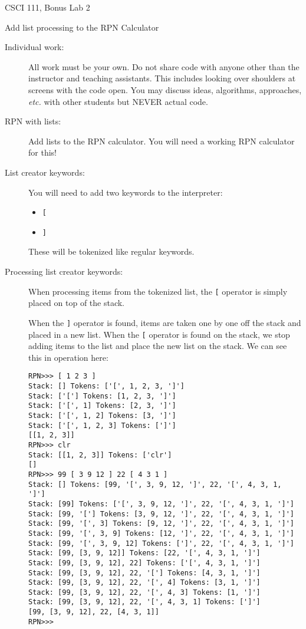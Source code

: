 \documentclass[12pt]{article}
\begin{document}
\sloppy
\centerline{\Large CSCI 111, Bonus Lab 2}
\centerline{\large Add list processing to the RPN Calculator}


\begin{description}

\item[Individual work:]  All work must be your own.  Do not share
code with anyone other than the instructor and teaching assistants.
This includes looking over shoulders at screens with the code open.
You may discuss ideas, algorithms, approaches, {\em etc.} with
other students but NEVER actual code.

\item[RPN with lists:]

Add lists to the RPN calculator.  You will need a working
RPN calculator for this!

\item[List creator keywords:]
You will need to add two keywords to the interpreter:
\begin{itemize}
\item \lstinline{[}
\item \lstinline{]}
\end{itemize}

These will be tokenized like regular keywords.

\item[Processing list creator keywords:]
When processing items from the tokenized list,
the \lstinline{[} operator is simply placed
on top of the stack.

When the \lstinline{]} operator is found,
items are taken one by one off the stack
and placed in a new list.  When the
\lstinline{[} operator is found on the
stack, we stop adding items to the list
and place the new list on the stack.
We can see this in operation here:
\begin{lstlisting}
RPN>>> [ 1 2 3 ]
Stack: [] Tokens: ['[', 1, 2, 3, ']']
Stack: ['['] Tokens: [1, 2, 3, ']']
Stack: ['[', 1] Tokens: [2, 3, ']']
Stack: ['[', 1, 2] Tokens: [3, ']']
Stack: ['[', 1, 2, 3] Tokens: [']']
[[1, 2, 3]]
RPN>>> clr
Stack: [[1, 2, 3]] Tokens: ['clr']
[]
RPN>>> 99 [ 3 9 12 ] 22 [ 4 3 1 ]
Stack: [] Tokens: [99, '[', 3, 9, 12, ']', 22, '[', 4, 3, 1, ']']
Stack: [99] Tokens: ['[', 3, 9, 12, ']', 22, '[', 4, 3, 1, ']']
Stack: [99, '['] Tokens: [3, 9, 12, ']', 22, '[', 4, 3, 1, ']']
Stack: [99, '[', 3] Tokens: [9, 12, ']', 22, '[', 4, 3, 1, ']']
Stack: [99, '[', 3, 9] Tokens: [12, ']', 22, '[', 4, 3, 1, ']']
Stack: [99, '[', 3, 9, 12] Tokens: [']', 22, '[', 4, 3, 1, ']']
Stack: [99, [3, 9, 12]] Tokens: [22, '[', 4, 3, 1, ']']
Stack: [99, [3, 9, 12], 22] Tokens: ['[', 4, 3, 1, ']']
Stack: [99, [3, 9, 12], 22, '['] Tokens: [4, 3, 1, ']']
Stack: [99, [3, 9, 12], 22, '[', 4] Tokens: [3, 1, ']']
Stack: [99, [3, 9, 12], 22, '[', 4, 3] Tokens: [1, ']']
Stack: [99, [3, 9, 12], 22, '[', 4, 3, 1] Tokens: [']']
[99, [3, 9, 12], 22, [4, 3, 1]]
RPN>>> 
\end{lstlisting}


\end{description}
\end{document}
